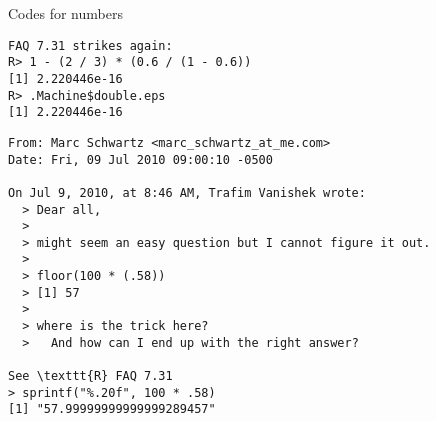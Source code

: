 \documentclass[11pt,compress,t,notes=noshow, xcolor=table]{beamer}
\begin{document}
\begin{vbframe}{Codes for numbers}
\begin{verbatim}
FAQ 7.31 strikes again:
R> 1 - (2 / 3) * (0.6 / (1 - 0.6))
[1] 2.220446e-16
R> .Machine$double.eps
[1] 2.220446e-16
\end{verbatim}

\framebreak
\vspace*{-0.5cm}
\begin{verbatim}
From: Marc Schwartz <marc_schwartz_at_me.com>
Date: Fri, 09 Jul 2010 09:00:10 -0500

On Jul 9, 2010, at 8:46 AM, Trafim Vanishek wrote:
  > Dear all,
  >
  > might seem an easy question but I cannot figure it out.
  >
  > floor(100 * (.58))
  > [1] 57
  >
  > where is the trick here?
  >   And how can I end up with the right answer?

See \texttt{R} FAQ 7.31
> sprintf("%.20f", 100 * .58)
[1] "57.99999999999999289457"
\end{verbatim}
\end{vbframe}

\endlecture
\end{document}
